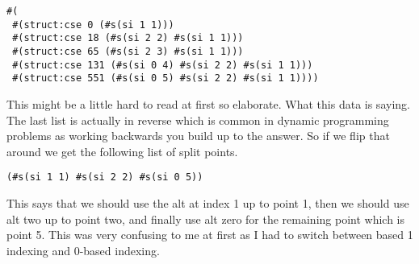 \documentclass{article}
\begin{document}
\begin{verbatim}
#(
 #(struct:cse 0 (#s(si 1 1)))
 #(struct:cse 18 (#s(si 2 2) #s(si 1 1)))
 #(struct:cse 65 (#s(si 2 3) #s(si 1 1)))
 #(struct:cse 131 (#s(si 0 4) #s(si 2 2) #s(si 1 1)))
 #(struct:cse 551 (#s(si 0 5) #s(si 2 2) #s(si 1 1))))
\end{verbatim}

This might be a little hard to read at first so elaborate. What this data is saying. The last list is actually in reverse which is common in dynamic programming problems as working backwards you build up to the answer. So if we flip that around we get the following list of split points.

\begin{verbatim}
(#s(si 1 1) #s(si 2 2) #s(si 0 5))
\end{verbatim}
This says that we should use the alt at index 1 up to point 1, then we should use alt two up to point two, and finally use alt zero for the remaining point which is point 5. This was very confusing to me at first as I had to switch between based 1 indexing and 0-based indexing. 
\end{document}
